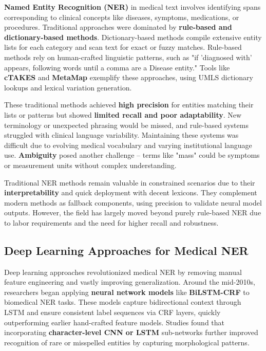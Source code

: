 \textbf{Named Entity Recognition (NER)} in medical text involves identifying spans corresponding to clinical concepts like diseases, symptoms, medications, or procedures. Traditional approaches were dominated by \textbf{rule-based and dictionary-based methods}. Dictionary-based methods compile extensive entity lists for each category and scan text for exact or fuzzy matches. Rule-based methods rely on human-crafted linguistic patterns, such as "if 'diagnosed with' appears, following words until a comma are a Disease entity." Tools like \textbf{cTAKES} and \textbf{MetaMap} exemplify these approaches, using UMLS dictionary lookups and lexical variation generation.

These traditional methods achieved \textbf{high precision} for entities matching their lists or patterns but showed \textbf{limited recall and poor adaptability}. New terminology or unexpected phrasing would be missed, and rule-based systems struggled with clinical language variability. Maintaining these systems was difficult due to evolving medical vocabulary and varying institutional language use. \textbf{Ambiguity} posed another challenge – terms like "mass" could be symptoms or measurement units without complex understanding.

Traditional NER methods remain valuable in constrained scenarios due to their \textbf{interpretability} and quick deployment with decent lexicons. They complement modern methods as fallback components, using precision to validate neural model outputs. However, the field has largely moved beyond purely rule-based NER due to labor requirements and the need for higher recall and robustness.

\subsection{Deep Learning Approaches for Medical NER}

Deep learning approaches revolutionized medical NER by removing manual feature engineering and vastly improving generalization. Around the mid-2010s, researchers began applying \textbf{neural network models} like \textbf{BiLSTM-CRF} to biomedical NER tasks. These models capture bidirectional context through LSTM and ensure consistent label sequences via CRF layers, quickly outperforming earlier hand-crafted feature models. Studies found that incorporating \textbf{character-level CNN or LSTM} sub-networks further improved recognition of rare or misspelled entities by capturing morphological patterns.

